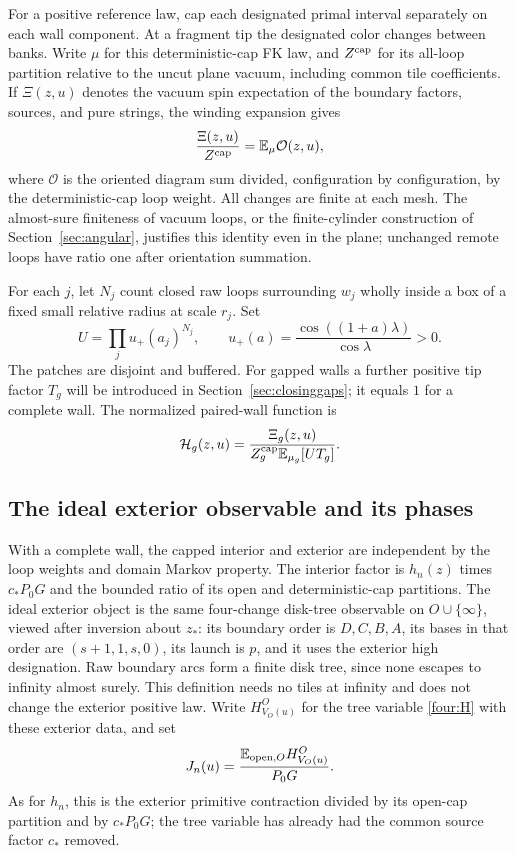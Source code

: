 For a positive reference law, cap each designated primal interval
separately on each wall component.  At a fragment tip the designated
color changes between banks.  Write $\mu$ for this deterministic-cap
FK law, and $Z^{\rm cap}$ for its all-loop partition relative to the
uncut plane vacuum, including common tile coefficients.  If
$\Xi(z,u)$ denotes the vacuum spin expectation of the boundary factors,
sources, and pure strings, the winding expansion gives
\begin{equation}
 \frac{\Xi(z,u)}{Z^{\rm cap}}
       =\mathbb E_\mu\mathcal O(z,u),
 \label{wall:diagram-normalization}
\end{equation}
where $\mathcal O$ is the oriented diagram sum divided, configuration
by configuration, by the deterministic-cap loop weight.  All changes
are finite at each mesh.  The almost-sure finiteness of vacuum loops,
or the finite-cylinder construction of Section~\ref{sec:angular},
justifies this identity even in the plane; unchanged remote loops have
ratio one after orientation summation.

For each $j$, let $N_j$ count closed raw loops surrounding $w_j$ wholly
inside a box of a fixed small relative radius at scale $r_j$.  Set
\begin{equation}
 U=\prod_j u_+(a_j)^{N_j},\qquad
 u_+(a)=\frac{\cos((1+a)\lambda)}{\cos\lambda}>0.
 \label{wall:U}
\end{equation}
The patches are disjoint and buffered.  For gapped walls a further
positive tip factor $T_g$ will be introduced in
Section~\ref{sec:closinggaps}; it equals $1$ for a complete wall.
The normalized paired-wall function is
\begin{equation}
 \mathcal H_g(z,u)=
 \frac{\Xi_g(z,u)}{Z_g^{\rm cap}\mathbb E_{\mu_g}[UT_g]}.
 \label{wall:H-normalized}
\end{equation}

\subsection{The ideal exterior observable and its phases}

With a complete wall, the capped interior and exterior are independent
by the loop weights and domain Markov property.  The interior factor
is $h_n(z)$ times $c_*P_0G$ and the bounded ratio of its open and
deterministic-cap partitions.  The ideal exterior object is the same
four-change disk-tree observable on $O\cup\{\infty\}$, viewed after
inversion about $z_*$: its boundary order is $D,C,B,A$, its bases in
that order are $(s+1,1,s,0)$, its launch is $p$, and it uses the exterior
high designation.  Raw boundary arcs form a finite disk tree, since
none escapes to infinity almost surely.  This definition needs no
tiles at infinity and does not change the exterior positive law.
Write $H^O_{V_O(u)}$ for the tree variable \eqref{four:H} with these
exterior data, and set
\begin{equation}
 J_n(u)=\frac{\mathbb E_{{\rm open},O}H^O_{V_O(u)}}{P_0G}.
 \label{wall:ideal-observable}
\end{equation}
As for $h_n$, this is the exterior primitive contraction divided by
its open-cap partition and by $c_*P_0G$; the tree variable has already
had the common source factor $c_*$ removed.

